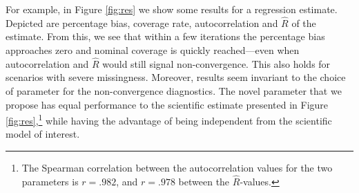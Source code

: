 \documentclass{article}
\begin{document}
For example, in Figure \ref{fig:res} we show some results for a regression estimate. Depicted are percentage bias, coverage rate,  autocorrelation and $\widehat{R}$ of the estimate. From this, we see that within a few iterations the percentage bias approaches zero and nominal coverage is quickly reached---even when autocorrelation and $\widehat{R}$ would still signal non-convergence. This also holds for scenarios with severe missingness. Moreover, results seem invariant to the choice of parameter for the non-convergence diagnostics. The novel parameter that we propose has equal performance to the scientific estimate presented in Figure \ref{fig:res},\footnote{The Spearman correlation between the autocorrelation values for the two parameters is $r=.982$, and $r=.978$ between the $\widehat{R}$-values.} while having the advantage of being independent from the scientific model of interest. 

% 

% 
\end{document}
